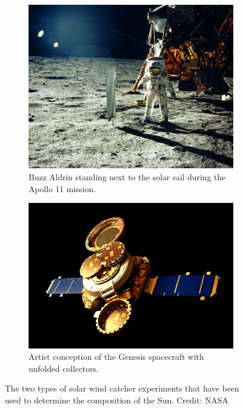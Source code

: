 \begin{figure}[bt]
    \begin{subfigure}{0.470209674\textwidth}
        \includegraphics[width=\textwidth]{graphics/solar_system_abundances/apollo11_aldrin_solar_sail}
        \caption{Buzz Aldrin standing next to the solar sail during the Apollo 11 mission.}
        \label{fig:solar_wind_catcher_experiments:solar_sail}
    \end{subfigure}
    \begin{subfigure}{0.529790326\textwidth}
        \includegraphics[width=\textwidth]{graphics/solar_system_abundances/genesis_spacecraft}
        \caption{Artist conception of the Genesis spacecraft with unfolded collectors.}
        \label{fig:solar_wind_catcher_experiments:genesis}
    \end{subfigure}
    \caption{The two types of solar wind catcher experiments that have been used to determine the composition of the Sun. Credit: NASA}
    \label{fig:solar_wind_catcher_experiments}
\end{figure}

